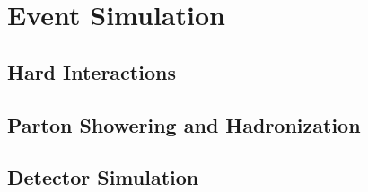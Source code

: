 \section{Event Simulation}\label{sec:event_sim}

\subsection{Hard Interactions}\label{sec:hard_inter}

\subsection{Parton Showering and Hadronization}\label{sec:hadronize}

\subsection{Detector Simulation}\label{sec:detect_sim}